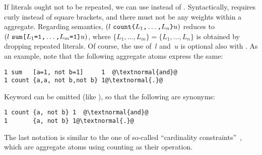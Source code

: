 If literals ought not to be repeated,
we can use  instead of .
Syntactically,  requires curly instead of square
brackets, and there must not be any weights within a  aggregate.
Regarding semantics,
$(
  l~ 
  \const{count} 
  \code{\char`\{}
  L_1\code{,}
  \dots\code{,}
  L_n
  \code{\char`\}}
  u
)$ 
reduces to
$(
  l~ 
  \texttt{sum} 
  \texttt{[}
  L_1\texttt{=}\texttt{1}\texttt{,}
  \dots\texttt{,}
  L_m\texttt{=}\texttt{1}
  \texttt{]}
  u
)$,
where $\{L_1,\dots,L_m\}=\{L_1,\dots,L_n\}$ is obtained by dropping
repeated literals.
Of course, the use of~$l$ and~$u$ is optional also with .
As an example, note that the following aggregate atoms express the same:
\begin{lstlisting}[numbers=none,escapechar=@]
1 sum   [a=1, not b=1]     1  @\textnormal{and}@ 
1 count {a,a, not b,not b} 1@\textnormal{.}@  
\end{lstlisting}
Keyword  can be omitted (like ),
so that the following are synonyms:
\begin{lstlisting}[numbers=none,escapechar=@]
1 count {a, not b} 1  @\textnormal{and}@ 
1       {a, not b} 1@\textnormal{.}@  
\end{lstlisting}
The last notation is similar to the one of so-called
``cardinality constraints''~\cite{siniso02a,lparseManual},
which are aggregate atoms using counting as their operation.

